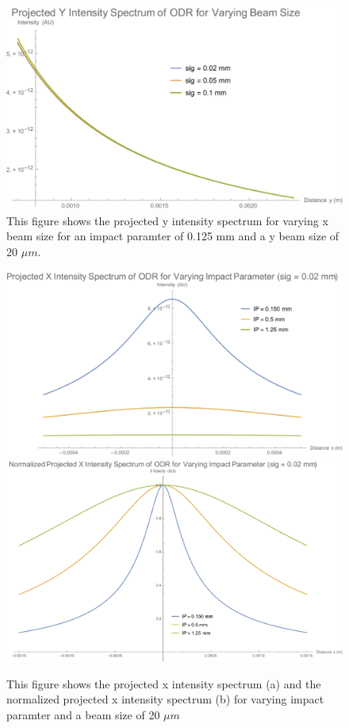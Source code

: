 \documentclass[12pt]{article}
\begin{document}
\begin{figure}
\begin{center}
\includegraphics[scale=0.5]{figures/ODR_ProjX_IntensityY.PDF}
\caption{This figure shows the projected y intensity spectrum for varying x beam size for an impact paramter of 0.125 mm and a y beam size of 20 $\mu m$.}
\end{center}
\end{figure}

\begin{figure}
\begin{center}
\includegraphics[scale=0.5]{figures/ODR_ProjY_IntensityX_IP.PDF}
\includegraphics[scale=0.5]{figures/ODR_ProjY_Norm_IntensityX_IP.PDF}
\caption{This figure shows the projected x intensity spectrum (a) and the normalized projected x intensity spectrum (b) for varying impact paramter and a beam size of 20 $\mu m$}
\end{center}
\end{figure}
\end{document}
